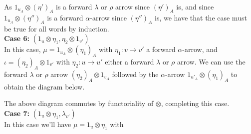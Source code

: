 \begin{varprf}
\begin{center}
    \end{center}
    As $1_{u_A} \otimes (\eta')_A$ is a forward $\lambda$ or $\rho$ arrow 
    since $(\eta')_A$ is, and since $1_{u_A} \otimes (\eta'')_A$ is a forward 
    $\alpha$-arrow since $(\eta'')_A$ is, we have that the case must be true 
    for all words by induction. 
    \\
    \textbf{Case 6:}  $(1_u \otimes \eta_1, \eta_2 \otimes 1_{v'})$\\
    In this case, $\mu = 1_{u_A} \otimes (\eta_1)_A$ with 
    $\eta_1: v \to v'$ a forward $\alpha$-arrow, and 
    $\iota = (\eta_2)_A \otimes 1_{v'}$ with $\eta_2: u \to u'$ 
    either a forward $\lambda$ or $\rho$ arrow. 
    We can use the forward $\lambda$ or $\rho$ arrow 
    $(\eta_2)_A \otimes 1_{v_A}$ followed by the $\alpha$-arrow 
    $1_{u'_A}\otimes (\eta_1)_A$ to obtain the diagram below.
    \begin{center}
    \end{center}
    The above diagram commutes by functoriality of $\otimes$, completing this case.
    \\
    \textbf{Case 7:} $(1_u \otimes \eta_1, \lambda_{v'})$\\
    In this case we'll have $\mu = 1_u \otimes \eta_1$ with 

\end{varprf}
